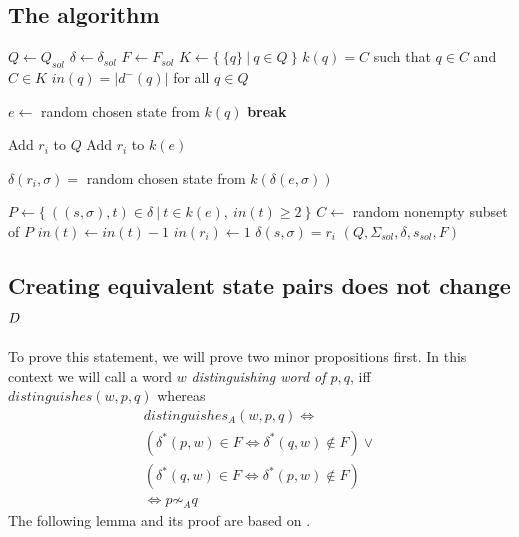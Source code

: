 \subsection{The algorithm}

\vspace{0.2cm}
\begin{spacing}{1}
\begin{algorithmic}[1]
    \State $Q \gets Q_{sol}$
    \State $\delta \gets \delta_{sol}$
    \State $F \gets F_{sol}$
	\State $K \gets \{\ \{q\}\ |\ q \in Q\ \}$ 
	\State $k(q) = C$ such that $q \in C$ and $C \in K$ 
	\State $in(q) = |d^-(q)|$ for all $q \in Q$ 
	
		 
				\State $e \gets$ random chosen state from $k(q)$
				\State \textbf{break}
			\EndIf
		\EndFor
		
        \State Add $r_i$ to $Q$ 
		\State Add $r_i$ to $k(e)$
		
		 
			\State $\delta(r_i, \sigma) =$ random chosen state from $k(\delta(e, \sigma))$
		\EndFor
		
		\State $P \gets \{\ ((s, \sigma), t) \in \delta\ |\ t \in k(e),\ in(t) \geq 2\ \}$ 
		\State $C \gets$ random nonempty subset of $P$
			\State $in(t) \gets in(t) - 1$
			\State $in(r_i) \gets 1$
            \State $\delta(s, \sigma) = r_i$
		\EndFor
	\EndFor
    \State \Return $(Q, \Sigma_{sol}, \delta, s_{sol}, F)$
	\EndFunction
\end{algorithmic}
\end{spacing}
\vspace{0.2cm}

\subsection{Creating equivalent state pairs does not change $D$} \label{ch:3:sec-D-proof}

To prove this statement, we will prove two minor propositions first. In this context we will call a word $w$ \emph{distinguishing word of $p,q$}, iff $distinguishes(w, p, q)$ whereas
\begin{multline*}
    distinguishes_A(w, p, q) \Leftrightarrow\\
    (\delta^*(p,w) \in F \Leftrightarrow \delta^*(q,w) \notin F) \lor\\ (\delta^*(q,w) \in F \Leftrightarrow \delta^*(p,w) \notin F)\\
    \Leftrightarrow p \not\sim_A q
\end{multline*}
The following lemma and its proof are based on \cite[ch.\ 4 p.\ 18]{MS18}.

